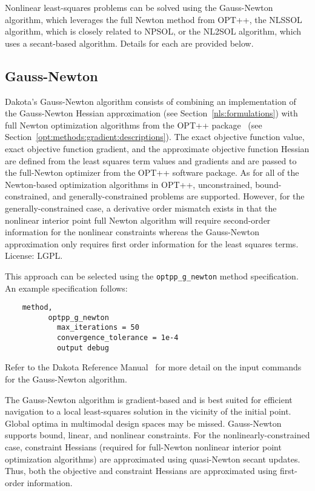 Nonlinear least-squares problems can be solved using the Gauss-Newton
algorithm, which leverages the full Newton method from OPT++, the
NLSSOL algorithm, which is closely related to NPSOL, or the NL2SOL
algorithm, which uses a secant-based algorithm. Details for each are
provided below.

\subsection{Gauss-Newton}\label{nls:solution:gauss}

Dakota's Gauss-Newton algorithm consists of combining an
implementation of the Gauss-Newton Hessian approximation (see
Section~\ref{nls:formulations}) with full Newton optimization
algorithms from the OPT++ package~\cite{MeOlHoWi07} (see
Section~\ref{opt:methods:gradient:descriptions}). The exact objective
function value, exact objective function gradient, and the approximate
objective function Hessian are defined from the least squares term
values and gradients and are passed to the full-Newton optimizer from
the OPT++ software package. As for all of the Newton-based
optimization algorithms in OPT++, unconstrained, bound-constrained,
and generally-constrained problems are supported. However, for the
generally-constrained case, a derivative order mismatch exists in that
the nonlinear interior point full Newton algorithm will require
second-order information for the nonlinear constraints whereas the
Gauss-Newton approximation only requires first order information for
the least squares terms. License: LGPL.

This approach can be selected using
the \texttt{optpp\_g\_newton} method specification. An example
specification follows:
\begin{small}
\begin{verbatim}
    method,
          optpp_g_newton
            max_iterations = 50
            convergence_tolerance = 1e-4
            output debug
\end{verbatim}
\end{small}

Refer to the Dakota Reference Manual~\cite{RefMan} for more detail on the
input commands for the Gauss-Newton algorithm.

The Gauss-Newton algorithm is gradient-based and is best suited for
efficient navigation to a local least-squares solution in the vicinity
of the initial point. Global optima in multimodal design spaces may be
missed. Gauss-Newton supports bound, linear, and nonlinear
constraints. For the nonlinearly-constrained case, constraint Hessians
(required for full-Newton nonlinear interior point optimization
algorithms) are approximated using quasi-Newton secant updates. Thus,
both the objective and constraint Hessians are approximated using
first-order information.

